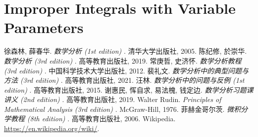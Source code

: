 \documentclass[11pt]{../../TexTemplate/elegantbook}
\begin{document}
\chapter{Improper Integrals with Variable Parameters}




\begin{thebibliography}{99} 
 徐森林, 薛春华. \emph{数学分析 (1st edition) }. 清华大学出版社, 2005.
 陈纪修, 於崇华. \emph{数学分析 (3rd edition) }. 高等教育出版社, 2019.
 常庚哲, 史济怀. \emph{数学分析教程 (3rd edition) }. 中国科学技术大学出版社, 2012.
 裴礼文. \emph{数学分析中的典型问题与方法 (3rd edition) }. 高等教育出版社, 2021.
 汪林. \emph{数学分析中的问题与反例 (1st edition) }. 高等教育出版社, 2015.
 谢惠民, 恽自求, 易法槐, 钱定边. \emph{数学分析习题课讲义 (2nd edition) }. 高等教育出版社, 2019.
 Walter Rudin. \emph{Principles of Mathematical Analysis (3rd edition) }. McGraw-Hill, 1976.
 菲赫金哥尔茨. \emph{微积分学教程 (8th edition) }. 高等教育出版社, 2006.
 Wikipedia. \url{https://en.wikipedia.org/wiki/}.
\end{thebibliography}
\end{document}
